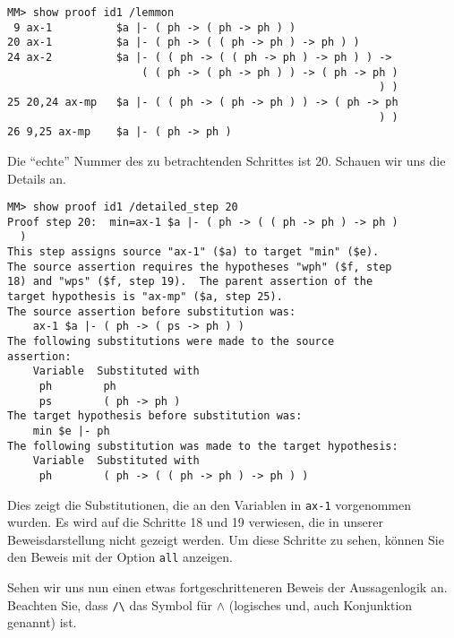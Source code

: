 \begin{verbatim}
MM> show proof id1 /lemmon
 9 ax-1          $a |- ( ph -> ( ph -> ph ) )
20 ax-1          $a |- ( ph -> ( ( ph -> ph ) -> ph ) )
24 ax-2          $a |- ( ( ph -> ( ( ph -> ph ) -> ph ) ) ->
                     ( ( ph -> ( ph -> ph ) ) -> ( ph -> ph )
                                                          ) )
25 20,24 ax-mp   $a |- ( ( ph -> ( ph -> ph ) ) -> ( ph -> ph
                                                          ) )
26 9,25 ax-mp    $a |- ( ph -> ph )
\end{verbatim}

Die "`echte"' Nummer des zu betrachtenden Schrittes ist 20.  Schauen wir uns die Details an.

\begin{verbatim}
MM> show proof id1 /detailed_step 20
Proof step 20:  min=ax-1 $a |- ( ph -> ( ( ph -> ph ) -> ph )
  )
This step assigns source "ax-1" ($a) to target "min" ($e).
The source assertion requires the hypotheses "wph" ($f, step
18) and "wps" ($f, step 19).  The parent assertion of the
target hypothesis is "ax-mp" ($a, step 25).
The source assertion before substitution was:
    ax-1 $a |- ( ph -> ( ps -> ph ) )
The following substitutions were made to the source
assertion:
    Variable  Substituted with
     ph        ph
     ps        ( ph -> ph )
The target hypothesis before substitution was:
    min $e |- ph
The following substitution was made to the target hypothesis:
    Variable  Substituted with
     ph        ( ph -> ( ( ph -> ph ) -> ph ) )
\end{verbatim}

Dies zeigt die Substitutionen, die an den Variablen in \texttt{ax-1} vorgenommen wurden.  Es wird auf die Schritte 18 und 19 verwiesen, die in unserer Beweisdarstellung nicht gezeigt werden.  Um diese Schritte zu sehen, können Sie den Beweis mit der Option \texttt{all} anzeigen.

Sehen wir uns nun einen etwas fortgeschritteneren Beweis der Aussagenlogik an.  Beachten Sie, dass \verb+/\+ das Symbol für $\wedge$ (logisches {\sc und}, auch Konjunktion genannt) ist.  

